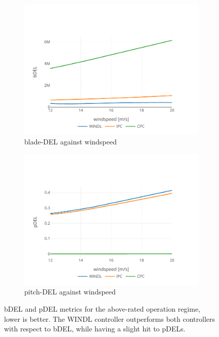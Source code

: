 \begin{figure}
  \centering
  \begin{subfigure}[b]{0.48\textwidth}
      \centering
      \includegraphics[width=\textwidth]{images/steady_sweep_bdel.pdf}
      \caption{blade-\ac{DEL} against windspeed}
      \label{fig:steady-sweep-bdel}
  \end{subfigure}
  \begin{subfigure}[b]{0.48\textwidth}
      \centering
      \includegraphics[width=\textwidth]{images/steady_sweep_pdel.pdf}
      \caption{pitch-\ac{DEL} against windspeed}
      \label{fig:steady-sweep-pdel}
  \end{subfigure}
  \caption{bDEL and pDEL metrics for the above-rated operation regime, lower is better. The WINDL controller outperforms both controllers with respect to bDEL, while having a slight hit to pDELs.}
  \label{fig:steady-sweep}
\end{figure}

